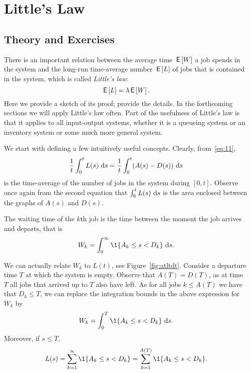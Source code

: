 \section{Little's Law}
\label{sec:littles-law}

\subsection*{Theory and Exercises}


There is an important relation between the average time $\,\mathsf{E}\left[W\right]$ a job
spends in the system and the long-run time-average number $\,\mathsf{E}\left[L\right]$ of jobs
that is contained in the system, which is called \emph{Little's law}:
\begin{equation}\label{eq:53}
  \,\mathsf{E}\left[L\right] = \lambda \,\mathsf{E}\left[W\right].
\end{equation}
Here we provide a sketch of its proof; 
\cite{el-taha98:_sampl_path_analy_queuein_system} provide the details. In
the forthcoming sections we will apply Little's law often. Part of the
usefulness of Little's law is that it applies to all input-output
systems, whether it is a queueing system or an inventory system or
some much more general system.

We start with defining a few intuitively useful concepts.  Clearly, from~\eqref{eq:11}, 
\begin{equation*}
\frac 1 t\int_0^t L(s)\, \,\text{d}s =  \frac 1 t\int_0^t (A(s)-D(s)) \, \,\text{d}s
\end{equation*}
is the time-average of the number of jobs in the system during
$[0,t]$. Observe once again from the second equation that
$\int_0^t L(s)\,\,\text{d}s$ is the area enclosed between the graphs of $A(s)$
and $D(s)$.


The waiting time of the $k$th job is the time between the moment the
job arrives and departs, that is
\begin{equation*}
  W_k = \int_0^\infty \1{A_k \leq s < D_k}\,\d s.
\end{equation*}

We can actually relate $W_k$ to $L(t)$, see
Figure~\ref{fig:atltdt}. Consider a departure time $T$ at which the
system is empty. Observe that $A(T) = D(T)$, as at time $T$ all jobs
that arrived up to $T$ also have left. As for all jobs $k\leq A(T)$
we have that $D_k \leq T$,  we can replace the integration
bounds in the above expression for $W_k$ by
\begin{equation*}
  W_k = \int_0^T \1{A_k \leq s < D_k}\,\d s.
\end{equation*}
Moreover, if $s\leq T$,
\begin{equation*}
L(s) = \sum_{k=1}^\infty \1{A_k \leq s < D_k} = \sum_{k=1}^{A(T)}\1{A_k \leq s < D_k}.
\end{equation*}

